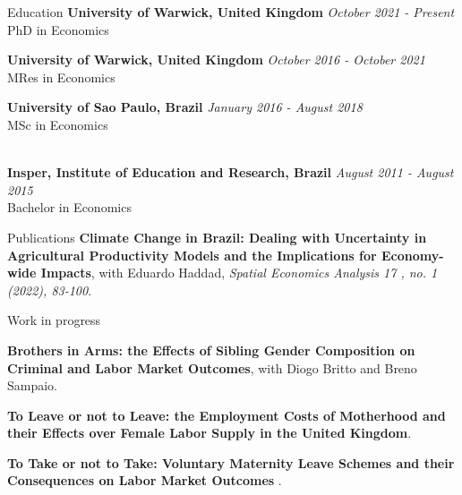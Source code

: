 \documentclass{resume} %
\begin{document}


\begin{rSection}{Education}
{\bf University of Warwick, United Kingdom } \hfill {\em October 2021 - Present} 
\\ PhD in Economics

{\bf University of Warwick, United Kingdom } \hfill {\em October 2016 - October 2021} 
\\ MRes in Economics

{\bf University of Sao Paulo, Brazil } \hfill {\em January 2016 - August 2018} 
\\ MSc in Economics

\\{\bf Insper, Institute of Education and Research, Brazil} \hfill {\em August 2011 - August 2015} 
\\ Bachelor in Economics
\end{rSection}


\begin{rSection}{Publications}
\textbf{Climate Change in Brazil: Dealing with Uncertainty in Agricultural Productivity Models and the Implications for Economy-wide Impacts}, with Eduardo Haddad, \textit{Spatial Economics Analysis 17 , no. 1 (2022), 83-100}.

\end{rSection}

 
\begin{rSection}{Work in progress}

\textbf{Brothers in Arms: the Effects of Sibling Gender Composition on Criminal and Labor Market Outcomes}, with Diogo Britto and Breno Sampaio.

\textbf{To Leave or not to Leave: the Employment Costs of Motherhood and their Effects over Female Labor Supply in the United Kingdom}.

\textbf{To Take or not to Take: Voluntary Maternity Leave Schemes and their Consequences on Labor Market Outcomes }.


\end{rSection}
\end{document}
